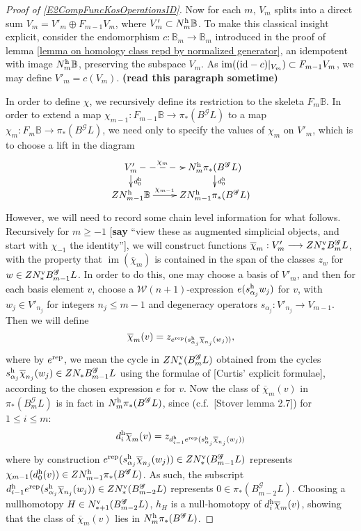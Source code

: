 \documentclass[11pt]{amsart}
\theoremstyle{plain}
\theoremstyle{definition}
\DeclareMathOperator{\im}{im}
\renewcommand{\to}{\longrightarrow}
\newcommand{\scrG}{\mathscr{G}}
\newcommand{\calw}{\mathcal{W}}
\theoremstyle{plain}
\newcommand{\BSW}{{\scrG}}
\newcommand{\BSWres}{B^\BSW}%
\newcommand{\Id}{\textup{id}}
\begin{document}
\begin{Operations in composite functor spectral sequences}
\begin{proof}[Proof of \ref{E2CompFuncKosOperationsID}]
Now for each $m$, $V_m$ splits into a direct sum
$V_m=V'_m\oplus F_{m-1}V_m$,
where $V'_m\subset N_m^\textup{h}\mathbb{B}$. To make this classical insight explicit, consider the endomorphism $c:\mathbb{B}_m\to \mathbb{B}_m$ introduced in the proof of lemma \ref{lemma on homology class repd by normalized generator}, an idempotent with image $N_m^\textup{h}\mathbb{B}$, preserving the subspace $V_m$. As $\im((\Id-c)|_{V_m})\subset F_{m-1}V_m$, we may define $V'_m=c(V_m)$. \textbf{(read this paragraph sometime)}

In order to define $\chi$, we recursively define its restriction to the skeleta $F_m\mathbb{B}$. In order to extend a map $\chi_{m-1}:F_{m-1}\mathbb{B}\to \pi_*(\BSWres L)$ to a map $\chi_m:F_m\mathbb{B}\to \pi_*(\BSWres L)$, we need only to specify the values of $\chi_m$ on $V'_m$, which is to choose a lift in the diagram
\[\xymatrix@R=4mm{
V'_m\ar@{-->}[r]^-{\chi_m}
\ar[d]^-{d_0^\textup{h}}
&%
N^\textup{h}_m\pi_*(\BSWres L)\ar[d]^-{d_0^\textup{h}}
\\%
ZN^\textup{h}_{m-1}\mathbb{B}\ar[r]^-{\chi_{m-1}}
&%
ZN^\textup{h}_{m-1}\pi_*(\BSWres L)%
}\]
However, we will need to record some chain level information for what follows. Recursively for $m\geq-1$ [\textbf{say} ``view these as augmented simplicial objects, and start with $\chi_{-1}$ the identity''], we will construct functions $\overline{\chi}_m:V'_m\to ZN^\textup{v}_*\BSWres_m L$, with the property that $\im(\overline{\chi}_m)$ is contained in the span of the classes $z_{w}$ for $w\in ZN^\textup{v}_*\BSWres_{m-1}L$. In order to do this, one may choose a basis of $V'_m$, and then for each basis element $v$, choose a $\calw(n+1)$-expression $e(s^\textup{h}_{\alpha_j}w_j)$ for $v$, with $w_j\in V'_{n_j}$ for integers $n_j\leq m-1$ and degeneracy operators $s_{\alpha_j}:V'_{n_j}\to V_{m-1}$. Then we will define
\[\overline{\chi}_m(v)=z_{e^\textup{rep}(s^\textup{h}_{\alpha_j}\overline{\chi}_{n_j}(w_j))},\]
where by $e^\textup{rep}$, we mean the cycle in $ZN_*^\textup{v}(\BSWres_mL)$ obtained from the cycles $s^\textup{h}_{\alpha_j}\overline{\chi}_{n_j}(w_j)\in ZN_*\BSWres_{m-1}L$ using the formulae of [Curtis' explicit formulae], according to the chosen expression $e$ for $v$.
Now the class of $\overline{\chi}_m(v)$ in $\pi_*(\BSWres_mL)$ is in fact in $N^\textup{h}_m\pi_*(\BSWres L)$, since (c.f.\ [Stover lemma 2.7]) for $1\leq i \leq m$:
\[d_i^\textup{h}\overline{\chi}_m(v) =z_{d^\textup{h}_{i-1}e^\textup{rep}(s^\textup{h}_{\alpha_j}\overline{\chi}_{n_j}(w_j))}\]
where by construction $e^\textup{rep}(s^\textup{h}_{\alpha_j}\overline{\chi}_{n_j}(w_j))\in ZN^\textup{v}_*(\BSWres_{m-1} L)$ represents $\chi_{m-1}(d_{0}^\textup{h}(v))\in ZN_{m-1}^\textup{h}\pi_*(\BSWres  L)$. As such, the subscript $d^\textup{h}_{i-1}e^\textup{rep}(s^\textup{h}_{\alpha_j}\overline{\chi}_{n_j}(w_j))\in ZN^\textup{v}_*(\BSWres_{m-2} L)$ represents $0\in\pi_*(\BSWres_{m-2}L)$. Choosing a nullhomotopy $H\in N^\textup{v}_{*+1}(\BSWres_{m-2}L)$, $h_H$ is a null-homotopy of $d_i^\textup{h}\overline{\chi}_m(v)$, showing that the class of  $\overline{\chi}_m(v)$ lies in $N^\textup{h}_m\pi_*(\BSWres L)$.

\end{proof}
\end{Operations in composite functor spectral sequences}
\end{document}
